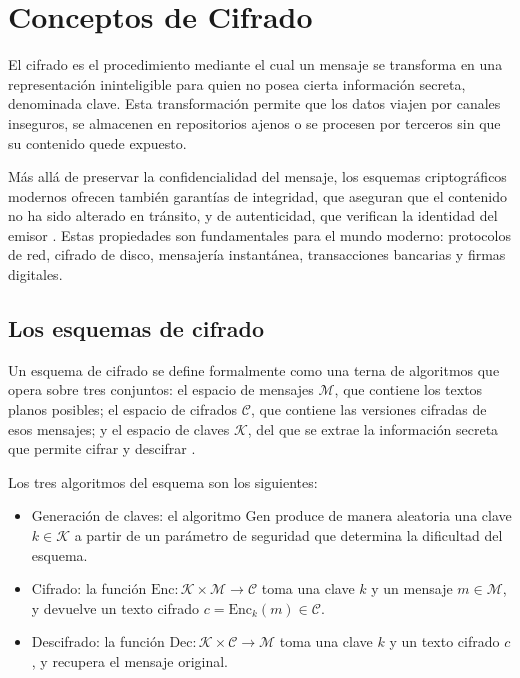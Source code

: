 \chapter{Conceptos de Cifrado}

El cifrado es el procedimiento mediante el cual un mensaje se transforma en una representación ininteligible para quien no posea cierta información secreta, denominada clave. Esta transformación permite que los datos viajen por canales inseguros, se almacenen en repositorios ajenos o se procesen por terceros sin que su contenido quede expuesto.

Más allá de preservar la confidencialidad del mensaje, los esquemas criptográficos modernos ofrecen también garantías de integridad, que aseguran que el contenido no ha sido alterado en tránsito, y de autenticidad, que verifican la identidad del emisor \cite{KatzLindell}. Estas propiedades son fundamentales para el mundo moderno: protocolos de red, cifrado de disco, mensajería instantánea, transacciones bancarias y firmas digitales.

\section{Los esquemas de cifrado}

Un esquema de cifrado se define formalmente como una terna de algoritmos que opera sobre tres conjuntos: el espacio de mensajes $\mathcal{M}$, que contiene los textos planos posibles; el espacio de cifrados $\mathcal{C}$, que contiene las versiones cifradas de esos mensajes; y el espacio de claves $\mathcal{K}$, del que se extrae la información secreta que permite cifrar y descifrar \cite{KatzLindell}.

Los tres algoritmos del esquema son los siguientes:

\begin{itemize}
    \item Generación de claves: el algoritmo $\text{Gen}$ produce de manera aleatoria una clave $k \in \mathcal{K}$ a partir de un parámetro de seguridad que determina la dificultad del esquema.
    \item Cifrado: la función $\text{Enc}: \mathcal{K} \times \mathcal{M} \to \mathcal{C}$ toma una clave $k$ y un mensaje $m \in \mathcal{M}$, y devuelve un texto cifrado $c = \text{Enc}_k(m) \in \mathcal{C}$.
    \item Descifrado: la función $\text{Dec}: \mathcal{K} \times \mathcal{C} \to \mathcal{M}$ toma una clave $k$ y un texto cifrado $c$, y recupera el mensaje original.
\end{itemize}

